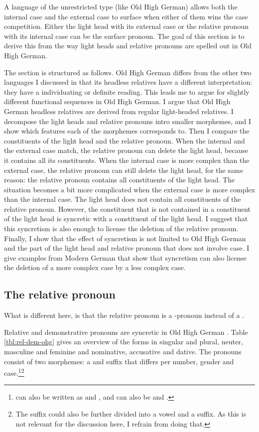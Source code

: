 A language of the unrestricted type (like Old High German) allows both the internal case and the external case to surface when either of them wins the case competition. Either the light head with its external case or the relative pronoun with its internal case can be the surface pronoun. The goal of this section is to derive this from the way light heads and relative pronouns are spelled out in Old High German.

The section is structured as follows.
Old High German differs from the other two languages I discussed in that its headless relatives have a different interpretation: they have a individuating or definite reading. This leads me to argue for slightly different functional sequences in Old High German.
I argue that Old High German headless relatives are derived from regular light-headed relatives.
I decompose the light heads and relative pronouns intro smaller morphemes, and I show which features each of the morphemes corresponds to.
Then I compare the constituents of the light head and the relative pronoun.
When the internal and the external case match, the relative pronoun can delete the light head, because it contains all its constituents.
When the internal case is more complex than the external case, the relative pronoun can still delete the light head, for the same reason: the relative pronoun contains all constituents of the light head.
The situation becomes a bit more complicated when the external case is more complex than the internal case. The light head does not contain all constituents of the relative pronoun. However, the constituent that is not contained in a constituent of the light head is syncretic with a constituent of the light head. I suggest that this syncretism is also enough to license the deletion of the relative pronoun.
Finally, I show that the effect of syncretism is not limited to Old High German and the part of the light head and relative pronoun that does not involve case. I give examples from Modern German that show that syncretism can also license the deletion of a more complex case by a less complex case.



\subsection{The relative pronoun}

What is different here, is that the relative pronoun is a -pronoun instead of a .


Relative and demonstrative pronouns are syncretic in Old High German . Table \ref{tbl:rel-dem-ohg} gives an overview of the forms in singular and plural, neuter, masculine and feminine and nominative, accusative and dative. The pronouns consist of two morphemes: a  and suffix that differs per number, gender and case.\footnote{
 can also be written as  and ,  and  can also be  and  .
}\footnote{
The suffix could also be further divided into a vowel and a suffix. As this is not relevant for the discussion here, I refrain from doing that.
}

